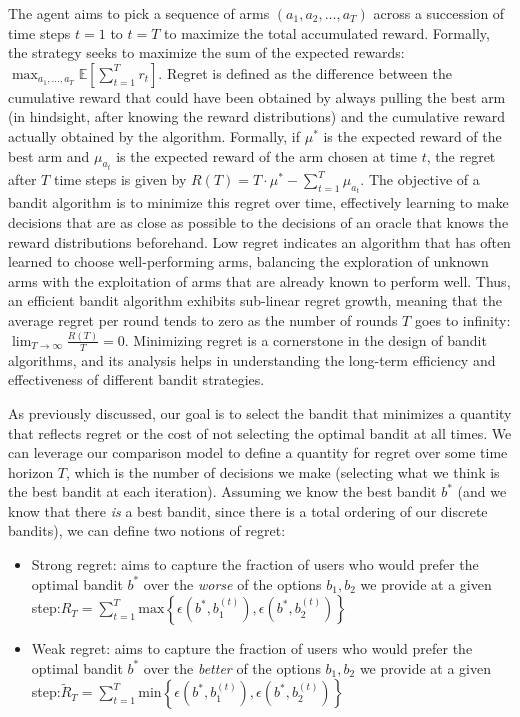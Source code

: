 \documentclass[
  letterpaper,
  numbers=noenddot,
  DIV=11]{scrreprt}
\theoremstyle{plain}
\theoremstyle{definition}
\theoremstyle{plain}
\theoremstyle{remark}
\begin{document}
The agent aims to pick a sequence of arms \((a_1, a_2, \ldots, a_T)\)
across a succession of time steps \(t = 1\) to \(t = T\) to maximize the
total accumulated reward. Formally, the strategy seeks to maximize the
sum of the expected rewards:
\(\max_{a_1, \ldots, a_T} \mathbb{E} \left[\sum_{t=1}^{T} r_t\right]\).
Regret is defined as the difference between the cumulative reward that
could have been obtained by always pulling the best arm (in hindsight,
after knowing the reward distributions) and the cumulative reward
actually obtained by the algorithm. Formally, if \(\mu^*\) is the
expected reward of the best arm and \(\mu_{a_t}\) is the expected reward
of the arm chosen at time \(t\), the regret after \(T\) time steps is
given by \(R(T) = T \cdot \mu^* - \sum_{t=1}^{T} \mu_{a_t}\). The
objective of a bandit algorithm is to minimize this regret over time,
effectively learning to make decisions that are as close as possible to
the decisions of an oracle that knows the reward distributions
beforehand. Low regret indicates an algorithm that has often learned to
choose well-performing arms, balancing the exploration of unknown arms
with the exploitation of arms that are already known to perform well.
Thus, an efficient bandit algorithm exhibits sub-linear regret growth,
meaning that the average regret per round tends to zero as the number of
rounds \(T\) goes to infinity:
\(\lim_{T \to \infty} \frac{R(T)}{T} = 0\). Minimizing regret is a
cornerstone in the design of bandit algorithms, and its analysis helps
in understanding the long-term efficiency and effectiveness of different
bandit strategies.

As previously discussed, our goal is to select the bandit that minimizes
a quantity that reflects regret or the cost of not selecting the optimal
bandit at all times. We can leverage our comparison model to define a
quantity for regret over some time horizon \(T\), which is the number of
decisions we make (selecting what we think is the best bandit at each
iteration). Assuming we know the best bandit \(b^*\) (and we know that
there \emph{is} a best bandit, since there is a total ordering of our
discrete bandits), we can define two notions of regret:

\begin{itemize}
\item
  Strong regret: aims to capture the fraction of users who would prefer
  the optimal bandit \(b^*\) over the \emph{worse} of the options
  \(b_1, b_2\) we provide at a given
  step:\(R_T = \sum_{t = 1}^T \text{max} \left\{ \epsilon(b^*, b_1^{(t)}), \epsilon(b^*, b_2^{(t)}) \right\}\)
\item
  Weak regret: aims to capture the fraction of users who would prefer
  the optimal bandit \(b^*\) over the \emph{better} of the options
  \(b_1, b_2\) we provide at a given
  step:\(\tilde{R}_T = \sum_{t = 1}^T \text{min} \left\{ \epsilon(b^*, b_1^{(t)}), \epsilon(b^*, b_2^{(t)}) \right\}\)
\end{itemize}
\end{document}
